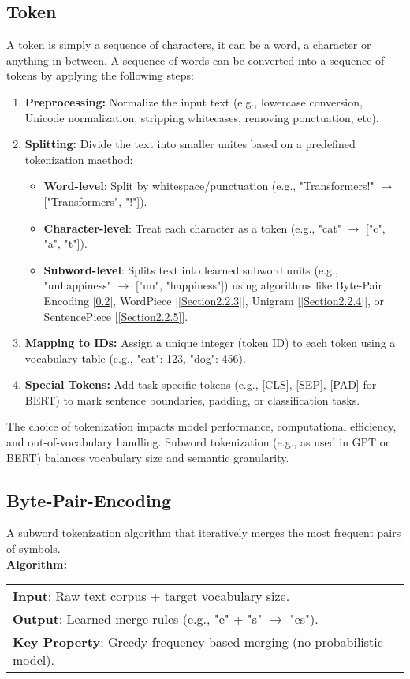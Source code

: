 \subsection{Token}\label{Section2.2.1}
A token is simply a sequence of characters, it can be a word, a character or anything in between.
A sequence of words can be converted into a sequence of tokens by applying the following steps:
\begin{enumerate}
    \item \textbf{Preprocessing:} Normalize the input text (e.g., lowercase conversion, Unicode normalization, stripping whitecases, removing ponctuation, etc).
    \item \textbf{Splitting:} Divide the text into smaller unites based on a predefined tokenization maethod:
    \begin{itemize}
        \item \textbf{Word-level}: Split by whitespace/punctuation (e.g., "Transformers!" $\rightarrow$ ["Transformers", "!"]).
        \item \textbf{Character-level}: Treat each character as a token (e.g., "cat" $\rightarrow$ ["c", "a", "t"]).
        \item \textbf{Subword-level}: Splits text into learned subword units (e.g., "unhappiness" $\rightarrow$ ["un", "happiness"]) using algorithms like Byte-Pair Encoding [\ref{Section2.2.2}], WordPiece [\ref{Section2.2.3}], Unigram [\ref{Section2.2.4}], or SentencePiece [\ref{Section2.2.5}].
    \end{itemize}
    \item \textbf{Mapping to IDs:} Assign a unique integer (token ID) to each token using a vocabulary table (e.g., {"cat": 123, "dog": 456}).
    
    \item \textbf{Special Tokens:} Add task-specific tokens (e.g., [CLS], [SEP], [PAD] for BERT) to mark sentence boundaries, padding, or classification tasks.
\end{enumerate}
The choice of tokenization impacts model performance, computational efficiency, and out-of-vocabulary handling.
Subword tokenization (e.g., as used in GPT or BERT) balances vocabulary size and semantic granularity.

\subsection{Byte-Pair-Encoding}\label{Section2.2.2}
    A subword tokenization algorithm that iteratively merges the most frequent pairs of symbols. \\
    \textbf{Algorithm:} \\
    \begin{tabular}{ll}  
        \textbf{Input}: Raw text corpus + target vocabulary size.  \\
        \textbf{Output}: Learned merge rules (e.g., "e" + "s" $\rightarrow$ "es").  \\
        \textbf{Key Property}: Greedy frequency-based merging (no probabilistic model).  \\
    \end{tabular} 

